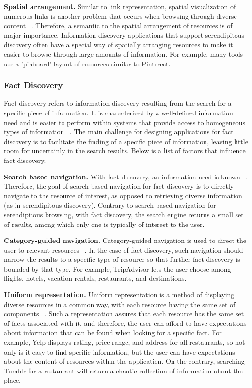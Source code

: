{\textbf{Spatial arrangement.} Similar to link representation, spatial visualization of numerous links is another problem that occurs when browsing through diverse content ~\cite{abrams}. Therefore, a semantic to the spatial arrangement of resources is of major importance. Information discovery applications that support serendipitous discovery often have a special way of spatially arranging resources to make it easier to browse through large amounts of information. For example, many tools use a 'pinboard' layout of resources similar to Pinterest.



} %

{\subsubsection{Fact Discovery}
Fact discovery refers to information discovery resulting from the search for a specific piece of information. It is characterized by a well-defined information need and is easier to perform within systems that provide access to homogeneous types of information ~\cite{kellar2006, lindley}. The main challenge for designing applications for fact discovery is to facilitate the finding of a specific piece of information, leaving little room for uncertainly in the search results. Below is a list of factors that influence fact discovery. 

\textbf{Search-based navigation.} With fact discovery, an information need is known ~\cite{kellar2006, kellar2007}. Therefore, the goal of search-based navigation for fact discovery is to directly navigate to the resource of interest, as opposed to retrieving diverse information (as in serendipitous discovery). Contrary to search-based navigation for serendipitous browsing, with fact discovery, the search engine returns a small set of results, among which only one is typically of interest to the user.

\textbf{Category-guided navigation.} Category-guided navigation is used to direct the user to relevant resources ~\cite{levene}. In the case of fact discovery, such navigation should narrow the results to a specific type of resource so that further fact discovery is bounded by that type. For example, TripAdvisor lets the user choose among flights, hotels, vacation rentals, restaurants, and destinations.

\textbf{Uniform representation.} Uniform representation is a method of displaying diverse resources in a common way, with each resource having the same set of components ~\cite{herrera}. Such a representation assures that each resource has the same set of facts associated with it, and therefore, the user can afford to have expectations about information that can be found when looking for a specific fact. For example, Yelp displays rating, price range, and address for all restaurants, so not only is it easy to find specific information, but the user can have expectations about the content of resources within the application. On the contrary, searching Tumblr for a restaurant will return a chaotic collection of information about the place. 

}
